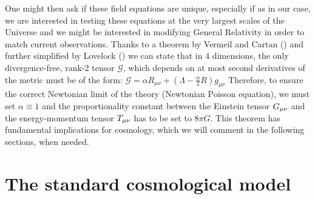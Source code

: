 One might then ask if these field equations are unique, especially if as in our case, 
we are interested in testing these equations at the very largest scales of the Universe and we might 
be interested in modifying General Relativity in order to match current observations.
Thanks to a theorem by Vermeil and Cartan (\cite{cite Vermeil, Cartan, 1921}) 
and further simplified by Lovelock (\cite{1970, Lovelock}) we can state that in 4 dimensions,
the only divergence-free, rank-2 tensor $\mathcal{G}$, which depends on at most second derivatives
of the metric must be of the form:
\beeqp$
\mathcal{G} =  \alpha R_{\mu \nu} + \left( \Lambda - \frac{\alpha}{2} R \right) g_{\mu \nu}
$
Therefore, to ensure the correct Newtonian limit of the theory (Newtonian Poisson equation), we must set $\alpha \equiv 1$
and the proportionality constant between the Einstein tensor $G_{\mu \nu}$  and the energy-momentum tensor
$T_{\mu \nu}$ has to be set to $8 \pi G$.
This theorem has fundamental implications for cosmology, which we will comment 
in the following sections, when needed.



\section{The standard cosmological model \label{sec:Standard-LCDM}}

